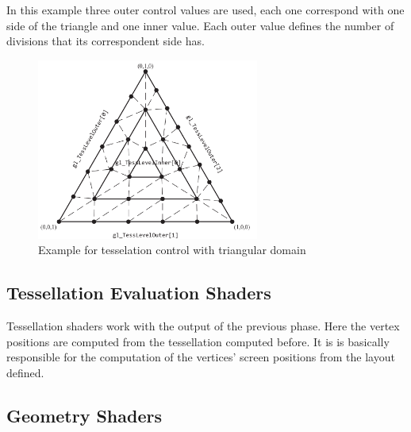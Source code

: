 In this example three outer control values are used, each one correspond with one side of the triangle and one inner value. Each outer value defines the number of divisions that its correspondent side has. 

\begin{figure}[htbp]
	\centering
	\includegraphics[width=0.65\textwidth]{images/OpenGL/TessShaderEx1.png}
	\caption{Example for tesselation control with triangular domain \cite{shreiner2013opengl}}
	\label{fig:ex1TessControl}
\end{figure}




\subsection{Tessellation Evaluation Shaders} %
\label{sub:tesselation_evaluation_shaders}
Tessellation shaders work with the output of the previous phase. Here the vertex positions are computed from the tessellation computed before. It is is basically responsible for the computation of the vertices' screen positions from the layout defined.



\subsection{Geometry Shaders} %
\label{sub:geometriy_shaders}

